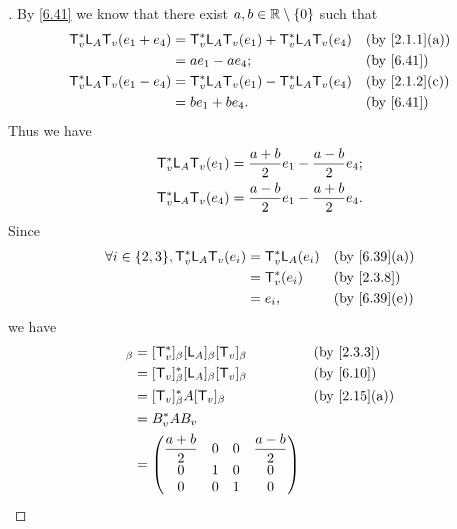\begin{proof}[]
  By \cref{6.41} we know that there exist \(a, b \in \mathbb{R} \setminus \left\lbrace0\right\rbrace\) such that
  \begin{align*}
    \T_v^* \L_A \T_v(e_1 + e_4) & = \T_v^* \L_A \T_v(e_1) + \T_v^* \L_A \T_v(e_4) &  & \by{2.1.1}[a] \\
                                & = a e_1 - a e_4;                                &  & \by{6.41}     \\
    \T_v^* \L_A \T_v(e_1 - e_4) & = \T_v^* \L_A \T_v(e_1) - \T_v^* \L_A \T_v(e_4) &  & \by{2.1.2}[c] \\
                                & = b e_1 + b e_4.                                &  & \by{6.41}
  \end{align*}
  Thus we have
  \begin{align*}
    \mathsf{T}_v^* \mathsf{L}_A \mathsf{T}_v(e_1) & = \dfrac{a + b}{2} e_1 - \dfrac{a - b}{2} e_4; \\
    \mathsf{T}_v^* \mathsf{L}_A \mathsf{T}_v(e_4) & = \dfrac{a - b}{2} e_1 - \dfrac{a + b}{2} e_4.
  \end{align*}
  Since
  \begin{align*}
    \forall i \in \set{2, 3}, \T_v^* \L_A \T_v(e_i) & = \T_v^* \L_A(e_i) &  & \by{6.39}[a] \\
                                                    & = \T_v^*(e_i)      &  & \by{2.3.8}   \\
                                                    & = e_i,             &  & \by{6.39}[e]
  \end{align*}
  we have
  \begin{align*}
    [\T_v^* \L_A \T_v]_{\beta} & = [\T_v^*]_{\beta} [\L_A]_{\beta} [\T_v]_{\beta} &  & \by{2.3.3}   \\
                               & = [\T_v]_{\beta}^* [\L_A]_{\beta} [\T_v]_{\beta} &  & \by{6.10}    \\
                               & = [\T_v]_{\beta}^* A [\T_v]_{\beta}              &  & \by{2.15}[a] \\
                               & = B_v^* A B_v                                                      \\
                               & = \begin{pmatrix}
                                     \dfrac{a + b}{2}  & 0 & 0 & \dfrac{a - b}{2}  \\
                                     0                 & 1 & 0 & 0                 \\
                                     0                 & 0 & 1 & 0                 \\

\end{pmatrix}
\end{align*}
\end{proof}
